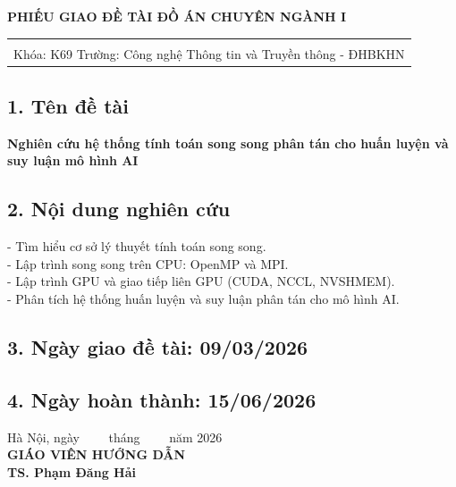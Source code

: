 \centerline{\textbf{\large PHIẾU GIAO ĐỀ TÀI ĐỒ ÁN CHUYÊN NGÀNH I}}

\begin{table}[H]
    \centering
    \begin{tabular}{l r}
    \fontsize{14pt}{0pt}\selectfont {Họ và tên sinh viên: Nguyễn Hoàng}    & \fontsize{14pt}{0pt}\selectfont {MSSV: 20250130E}\\
    \multicolumn{2}{c}{Khóa: K69 \hspace{2.5cm} Trường: Công nghệ Thông tin và Truyền thông - ĐHBKHN}
\end{tabular}
\end{table}
\subsection*{\textnormal{1. Tên đề tài}}
\textbf{Nghiên cứu hệ thống tính toán song song phân tán cho huấn luyện và suy luận mô hình AI}

\subsection*{\textnormal{2. Nội dung nghiên cứu}}
- Tìm hiểu cơ sở lý thuyết tính toán song song.\\
- Lập trình song song trên CPU: OpenMP và MPI.\\
- Lập trình GPU và giao tiếp liên GPU (CUDA, NCCL, NVSHMEM).\\
- Phân tích hệ thống huấn luyện và suy luận phân tán cho mô hình AI.

\subsection*{\textnormal{3. Ngày giao đề tài: 09/03/2026}}

\subsection*{\textnormal{4. Ngày hoàn thành: 15/06/2026}}

\vspace{1.5cm}
\hspace{9cm} \textnormal{Hà Nội, ngày \ \ \ \ tháng \ \ \ \ năm 2026}\\
\hspace{10cm} \textbf{{GIÁO VIÊN HƯỚNG DẪN}}\\
\vspace{1.5cm}
\hspace{10.5cm} \textbf{{TS. Phạm Đăng Hải}}\\
\newpage